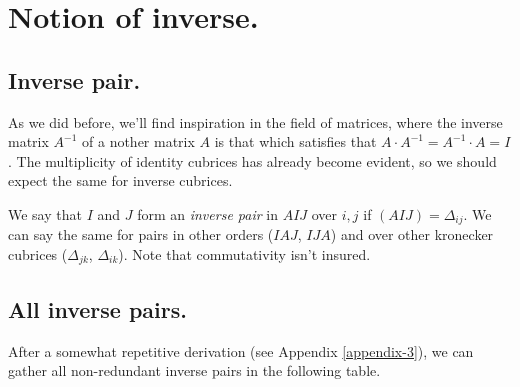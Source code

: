 \section{Notion of inverse.} \label{inverse}

\subsection{Inverse pair.} \label{inverse-pair}

As we did before, we'll find inspiration in the field of matrices, where the inverse matrix $A^{-1}$ of a nother matrix $A$ is that which satisfies that ${A\cdot A^{-1} = A^{-1} \cdot A = I}$. The multiplicity of identity cubrices has already become evident, so we should expect the same for inverse cubrices.

We say that $I$ and $J$ form an \textit{inverse pair} in $AIJ$ over $i, j$ if $(AIJ) = \Delta_{ij}$. We can say the same for pairs in other orders ($IAJ$, $IJA$) and over other kronecker cubrices ($\Delta_{jk}$, $\Delta_{ik}$). Note that commutativity isn't insured.

\subsection{All inverse pairs.} \label{inverse-all-pairs}

After a somewhat repetitive derivation (see Appendix \ref{appendix-3}), we can gather all non-redundant inverse pairs in the following table.

